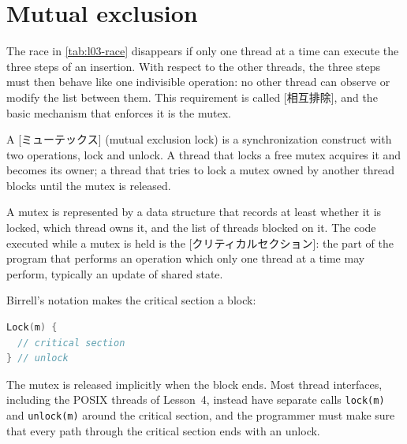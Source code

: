 \documentclass[../main.tex]{subfiles}
\begin{document}
\section{Mutual exclusion}
\label{sec:l03-mutex}

The race in \cref{tab:l03-race} disappears if only one thread at a time can
execute the three steps of an insertion.  With respect to
the other threads, the
three steps must then behave like one indivisible operation: no other
thread can observe or modify the list between them.  This requirement is
called [相互排除], and the basic mechanism that
enforces it is the mutex.

\begin{definition}[Mutex]
  A [ミューテックス] (mutual exclusion lock) is a synchronization
  construct with two operations, lock and unlock.  A thread that locks a
  free mutex acquires it and becomes its owner; a thread that tries to lock
  a mutex owned by another thread blocks until the mutex is released.
\end{definition}

A mutex is represented by a data structure that records at least whether it
is locked, which thread owns it, and the list of threads blocked on it.  The
code executed while a mutex is held is the [クリティカルセクション]: the
part of the program that performs an operation which only one thread at a
time may perform, typically an update of shared state.

Birrell's notation makes the critical section a block:
\begin{lstlisting}[language=C, numbers=none]
Lock(m) {
  // critical section
} // unlock
\end{lstlisting}
The mutex is released implicitly when the block ends.  Most thread
interfaces, including the POSIX threads of Lesson~4, instead have separate
calls \texttt{lock(m)} and \texttt{unlock(m)} around the critical section,
and the programmer must make sure that every path through the critical
section ends with an unlock.
\end{document}
